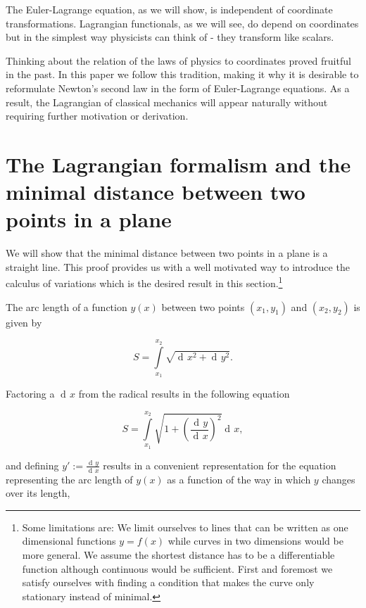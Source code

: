 \documentclass[prb,preprint]{revtex4-1}
\DeclareMathOperator{\dd}{d\!}
\begin{document}
The Euler-Lagrange equation, as we will show, is independent of coordinate transformations. Lagrangian functionals, as we will see, do depend on coordinates but in the simplest way physicists can think of - they transform like scalars. 

Thinking about the relation of the laws of physics to coordinates proved fruitful in the past. In this paper we follow this tradition, making it why it is desirable to reformulate Newton's second law in the form of Euler-Lagrange equations. As a result, the Lagrangian of classical mechanics will appear naturally without requiring further motivation or derivation. 


\section{The Lagrangian formalism and the minimal distance between two points in a plane \cite{goldstein2002classical}}\label{distance}

We will show that the minimal distance between two points in a plane is a straight line. This proof provides us with a well motivated way to introduce the calculus of variations which is the desired result in this section.\footnote{Some limitations are:
We limit ourselves to lines that can be written as one dimensional functions $y=f(x)$ while curves in two dimensions would be more general. We assume the shortest distance has to be a differentiable function although continuous would be sufficient. First and foremost we satisfy ourselves with finding a condition that makes the curve only stationary instead of minimal.}

The arc length of a function $y(x)$ between two points $(x_1,y_1)$ and $(x_2,y_2)$ is given by

\begin{equation}
S=\int\limits_{x_1}^{x_2}\sqrt{\dd x^2 + \dd y^2}.
\end{equation}

Factoring a $\dd x$ from the radical results in the following equation

\begin{equation}
S= \int\limits_{x_1}^{x_2}\sqrt{1 + \left(\frac{\dd y}{\dd x}\right)^2} \dd x,
\end{equation}

and defining $y' := \frac{\dd y}{\dd x}$ results in a convenient representation for the equation representing the arc length of $y(x)$ as a function of the way in which $y$ changes over its length, %
\end{document}
